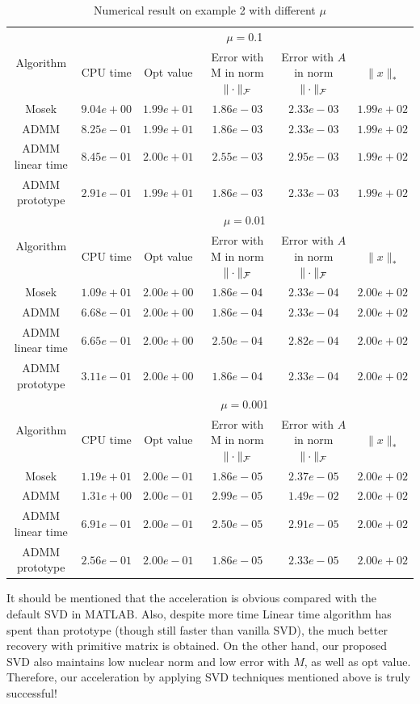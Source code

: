 \documentclass{article}
\begin{document}
		\begin{table}
			\centering
			\begin{tabular}{|c|c|c|c|c|c|}
			
			\hline
			\multirow{2}{*}{ Algorithm} &\multicolumn{5}{c|}{$\mu=$0.1}\\\cline{2-6}
			 &CPU time &Opt value &Error with M in norm $\|\cdot\|_\mathcal F$ &Error with $A$ in norm $\|\cdot\|_\mathcal F$ &$\|x\|_*$\\\hline
			Mosek & $9.04e+00$ & $1.99e+01$ & $1.86e-03$ & $2.33e-03$ & $1.99e+02$\\\hline
			ADMM & $8.25e-01$ & $1.99e+01$ & $1.86e-03$ & $2.33e-03$ & $1.99e+02$\\\hline
			ADMM linear time & $8.45e-01$ & $2.00e+01$ & $2.55e-03$ & $2.95e-03$ & $1.99e+02$\\\hline
			ADMM prototype & $2.91e-01$ & $1.99e+01$ & $1.86e-03$ & $2.33e-03$ & $1.99e+02$\\\hline
			\multirow{2}{*}{ Algorithm} &\multicolumn{5}{c|}{$\mu=$0.01}\\\cline{2-6}
 &CPU time &Opt value &Error with M in norm $\|\cdot\|_\mathcal F$ &Error with $A$ in norm $\|\cdot\|_\mathcal F$ &$\|x\|_*$\\\hline
Mosek & $1.09e+01$ & $2.00e+00$ & $1.86e-04$ & $2.33e-04$ & $2.00e+02$\\\hline
ADMM & $6.68e-01$ & $2.00e+00$ & $1.86e-04$ & $2.33e-04$ & $2.00e+02$\\\hline
ADMM linear time & $6.65e-01$ & $2.00e+00$ & $2.50e-04$ & $2.82e-04$ & $2.00e+02$\\\hline
ADMM prototype & $3.11e-01$ & $2.00e+00$ & $1.86e-04$ & $2.33e-04$ & $2.00e+02$\\\hline
\multirow{2}{*}{ Algorithm} &\multicolumn{5}{c|}{$\mu=$0.001}\\\cline{2-6}
 &CPU time &Opt value &Error with M in norm $\|\cdot\|_\mathcal F$ &Error with $A$ in norm $\|\cdot\|_\mathcal F$ &$\|x\|_*$\\\hline
Mosek & $1.19e+01$ & $2.00e-01$ & $1.86e-05$ & $2.37e-05$ & $2.00e+02$\\\hline
ADMM & $1.31e+00$ & $2.00e-01$ & $2.99e-05$ & $1.49e-02$ & $2.00e+02$\\\hline
ADMM linear time & $6.91e-01$ & $2.00e-01$ & $2.50e-05$ & $2.91e-05$ & $2.00e+02$\\\hline
ADMM prototype & $2.56e-01$ & $2.00e-01$ & $1.86e-05$ & $2.33e-05$ & $2.00e+02$\\\hline
	\end{tabular}
	\caption{Numerical result on example 2 with different $\mu$\label{example2}}
	\end{table}
			
It should be mentioned that the acceleration is obvious compared with the default SVD in MATLAB. Also, despite more time Linear time algorithm has spent than prototype (though still faster than vanilla SVD), the much better recovery with primitive matrix is obtained. On the other hand, our proposed SVD also maintains low nuclear norm and low error with $M$, as well as opt value. Therefore, our acceleration by applying SVD techniques mentioned above is truly successful!
		
		
  

\end{document}
